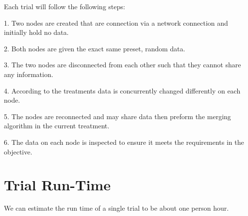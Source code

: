 \documentclass{article}
\begin{document}
Each trial will follow the following steps:

    1. Two nodes are created that are connection via a network connection and initially hold no data.

    2. Both nodes are given the exact same preset, random data.

    3. The two nodes are disconnected from each other such that they cannot share any information.

    4. According to the treatments data is concurrently changed differently on each node.

    5. The nodes are reconnected and may share data then preform the merging algorithm in the current treatment.

    6. The data on each node is inspected to ensure it meets the requirements in the objective.

\section*{Trial Run-Time}

We can estimate the run time of a single trial to be about one person hour.
\end{document}
